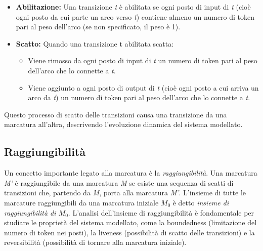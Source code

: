 \begin{itemize}
    \item \textbf{Abilitazione:} Una transizione \textit{t} è abilitata se ogni posto di input di \textit{t} (cioè ogni posto da cui parte un arco verso \textit{t}) contiene almeno un numero di token pari al peso dell'arco (se non specificato, il peso è 1).
    \item \textbf{Scatto:} Quando una transizione t abilitata scatta: 
    \begin{itemize}
        \item Viene rimosso da ogni posto di input di \textit{t} un numero di token pari al peso dell'arco che lo connette a \textit{t}.
        \item Viene aggiunto a ogni posto di output di \textit{t} (cioè ogni posto a cui arriva un arco da \textit{t}) un numero di token pari al peso dell'arco che lo connette a \textit{t}.
    \end{itemize}
\end{itemize}

Questo processo di scatto delle transizioni causa una transizione da una marcatura all'altra, descrivendo l'evoluzione dinamica del sistema modellato.

\subsection{Raggiungibilità}
Un concetto importante legato alla marcatura è la \textit{raggiungibilità}. Una marcatura \textit{M'} è raggiungibile da una marcatura \textit{M} se esiste una sequenza di scatti di transizioni che, partendo da \textit{M}, porta alla marcatura \textit{M'}. L'insieme di tutte le marcature raggiungibili da una marcatura iniziale $M_{0}$ è detto \textit{insieme di raggiungibilità di $M_{0}$}. L'analisi dell'insieme di raggiungibilità è fondamentale per studiare le proprietà del sistema modellato, come la boundedness (limitazione del numero di token nei posti), la liveness (possibilità di scatto delle transizioni) e la reversibilità (possibilità di tornare alla marcatura iniziale).